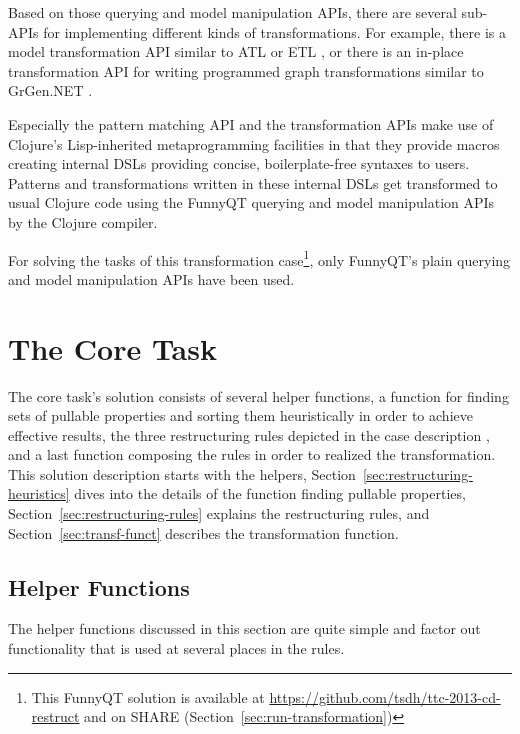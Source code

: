 \documentclass[11pt]{article}
\begin{document}
Based on those querying and model manipulation APIs, there are several sub-APIs
for implementing different kinds of transformations.  For example, there is a
model transformation API similar to ATL \cite{ATL05} or ETL
\cite{booklet:epsilon}, or there is an in-place transformation API for writing
programmed graph transformations similar to GrGen.NET
\cite{manual:GrGenManual}.

Especially the pattern matching API and the transformation APIs make use of
Clojure's Lisp-inherited metaprogramming facilities
\cite{Graham1993OnLisp,Hoyte08LoL} in that they provide macros creating
internal DSLs \cite{book:Fowler2010DSL} providing concise, boilerplate-free
syntaxes to users.  Patterns and transformations written in these internal DSLs
get transformed to usual Clojure code using the FunnyQT querying and model
manipulation APIs by the Clojure compiler.

For solving the tasks of this transformation case\footnote{This FunnyQT
  solution is available at \url{https://github.com/tsdh/ttc-2013-cd-restruct}
  and on SHARE (Section~\ref{sec:run-transformation})\label{fn:github}}, only
FunnyQT's plain querying and model manipulation APIs have been used.


\section{The Core Task}
\label{sec:core-task}

The core task's solution consists of several helper functions, a function for
finding sets of pullable properties and sorting them heuristically in order to
achieve effective results, the three restructuring rules depicted in the case
description \cite{cdrestructcasedesc}, and a last function composing the rules
in order to realized the transformation.  This solution description starts with
the helpers, Section~\ref{sec:restructuring-heuristics} dives into the details
of the function finding pullable properties,
Section~\ref{sec:restructuring-rules} explains the restructuring rules, and
Section~\ref{sec:transf-funct} describes the transformation function.

\subsection{Helper Functions}
\label{sec:helper-functions}

The helper functions discussed in this section are quite simple and factor out
functionality that is used at several places in the rules.
\end{document}
